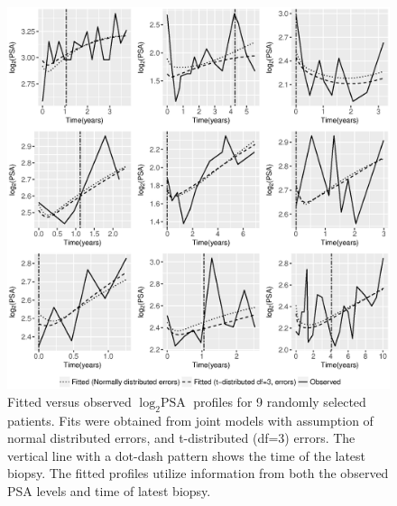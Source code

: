 \begin{enumerate}
    \begin{figure}[!htb]
	\centerline{\includegraphics[width=\columnwidth]{images/model_fit/subject_fittedVsObserved_psa_norm_t3.eps}}
	\caption{Fitted versus observed $\log_2 \mbox{PSA}$ profiles for 9 randomly selected patients. Fits were obtained from joint models with assumption of normal distributed errors, and t-distributed (df=3) errors. The vertical line with a dot-dash pattern shows the time of the latest biopsy. The fitted profiles utilize information from both the observed PSA levels and time of latest biopsy.}
	\label{fig : subject_fittedVsObserved_psa_norm_t3}
	\end{figure}


\end{enumerate}
